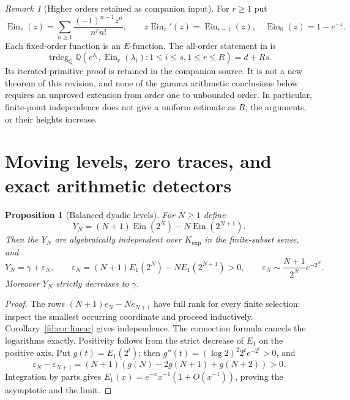 \documentclass[11pt,a4paper]{article}
\newcommand{\Qbar}{\overline{\mathbb Q}}
\newcommand{\Ein}{\operatorname{Ein}}
\newtheorem{proposition}[theorem]{Proposition}
\theoremstyle{definition}
\theoremstyle{remark}
\newtheorem{remark}[theorem]{Remark}
\numberwithin{equation}{section}
\begin{document}
\begin{remark}[Higher orders retained as companion input]\label{fd:rem:polyexp}
For $r\ge1$ put
\[
 \Ein_r(z)=\sum_{n\ge1}\frac{(-1)^{n-1}z^n}{n^r n!},\qquad
 z\Ein_r'(z)=\Ein_{r-1}(z),\quad \Ein_0(z)=1-e^{-z}.
\]
Each fixed-order function is an $E$-function.  The all-order statement
in \cite[``Multipoint one-level polyexponentials of arbitrary weight'']{pm:KEIO001}
is
\[
 \operatorname{trdeg}_{\Qbar}
 \Qbar(e^{\lambda_i},\Ein_r(\lambda_i):1\le i\le s, 1\le r\le R)
 =d+Rs.
\]
Its iterated-primitive proof is retained in the companion source.  It is
not a new theorem of this revision, and none of the gamma arithmetic
conclusions below requires an unproved extension from order one to
unbounded order.  In particular, finite-point independence does not give
a uniform estimate as $R$, the arguments, or their heights increase.
\end{remark}

\section{Moving levels, zero traces, and exact arithmetic detectors}
\label{fd:sec:moving}

\begin{proposition}[Balanced dyadic levels]\label{fd:prop:dyadic}
For $N\ge1$ define
\[
 Y_N=(N+1)\Ein(2^N)-N\Ein(2^{N+1}).
\]
Then the $Y_N$ are algebraically independent over $K_{\exp}$ in the
finite-subset sense, and
\begin{equation}\label{fd:eq:epsilon}
 Y_N=\gamma+\varepsilon_N,\qquad
 \varepsilon_N=(N+1)E_1(2^N)-NE_1(2^{N+1})>0,
 \qquad
 \varepsilon_N\sim\frac{N+1}{2^N}e^{-2^N}.
\end{equation}
Moreover $Y_N$ strictly decreases to $\gamma$.
\end{proposition}
\begin{proof}
The rows $(N+1)e_N-Ne_{N+1}$ have full rank for every finite selection:
inspect the smallest occurring coordinate and proceed inductively.
Corollary~\ref{fd:cor:linear} gives independence.  The connection formula
cancels the logarithms exactly.  Positivity follows from the strict
decrease of $E_1$ on the positive axis.  Put $g(t)=E_1(2^t)$; then
$g''(t)=(\log2)^2 2^t e^{-2^t}>0$, and
\[
 \varepsilon_N-\varepsilon_{N+1}
 =(N+1)(g(N)-2g(N+1)+g(N+2))>0.
\]
Integration by parts gives $E_1(x)=e^{-x}x^{-1}(1+O(x^{-1}))$, proving
the asymptotic and the limit.
\end{proof}
\end{document}

